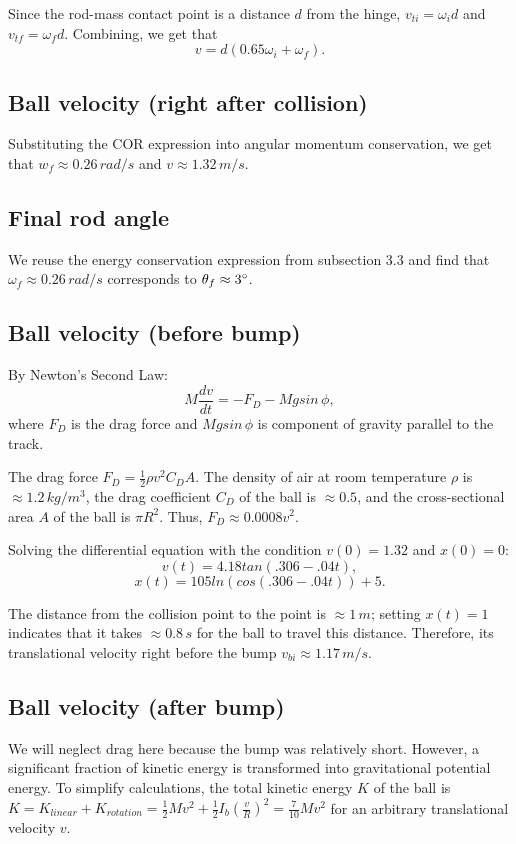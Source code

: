\documentclass[12pt]{article} %
\begin{document}
Since the rod-mass contact point is a distance $d$ from the hinge, $v_{ti} = \omega_i d$ and $v_{tf} = \omega_f d$. Combining, we get that $$v = d(0.65\omega_i + \omega_f).$$

\subsection{Ball velocity (right after collision)}

Substituting the COR expression into angular momentum conservation, we get that $w_f \approx 0.26\,rad/s$ and $v \approx 1.32\,m/s$.

\subsection{Final rod angle}

We reuse the energy conservation expression from subsection 3.3 and find that $\omega_f \approx 0.26\,rad/s$ corresponds to $\theta_f \approx 3\degree$.

\subsection{Ball velocity (before bump)}

By Newton's Second Law:
$$M \frac{dv}{dt} = -F_D - Mgsin\,\phi,$$
where $F_D$ is the drag force and $Mgsin\,\phi$ is component of gravity parallel to the track.

The drag force $F_D = \frac{1}{2}\rho v^2 C_D A$. The density of air at room temperature $\rho$ is $\approx 1.2\,kg/m^3$, the drag coefficient $C_D$ of the ball is $\approx 0.5$, and the cross-sectional area $A$ of the ball is $\pi R^2$.
Thus, $F_D \approx 0.0008v^2$.

Solving the differential equation with the condition $v(0) = 1.32$ and $x(0) = 0$: $$v(t) = 4.18tan(.306 - .04t),$$ $$x(t) = 105ln(cos(.306 - .04t)) + 5.$$

The distance from the collision point to the point is $\approx 1\, m$; setting $x(t) = 1$ indicates that it takes $\approx 0.8\,s$ for the ball to travel this distance. Therefore, its translational velocity right before the bump $v_{bi} \approx 1.17\,m/s$.

\subsection{Ball velocity (after bump)}

We will neglect drag here because the bump was relatively short.
However, a significant fraction of kinetic energy is transformed into gravitational potential energy.
To simplify calculations, the total kinetic energy $K$ of the ball is $K = K_{linear} + K_{rotation} = \frac{1}{2}Mv^2 + \frac{1}{2}I_b(\frac{v}{R})^2 = \frac{7}{10}Mv^2$ for an arbitrary translational velocity $v$.
\end{document}
